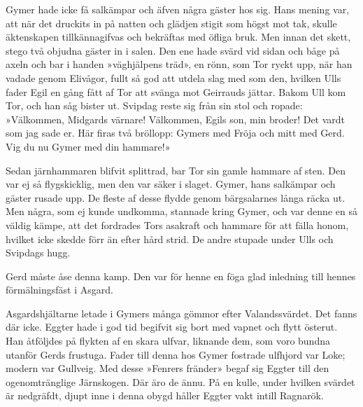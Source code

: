 \protect\hypertarget{lb1625905.xhtmlux5cux23start138}{}{}\protect\hypertarget{lb1625905.xhtmlux5cux23start138-a}{}{}\protect\hypertarget{lb1625905.xhtmlux5cux23start138-b}{}{}\protect\hypertarget{lb1625905.xhtmlux5cux23start138-c}{}{}\protect\hypertarget{lb1625905.xhtmlux5cux23start138-d}{}{}

Gymer hade icke få salkämpar och äfven några gäster hos sig. Hans mening
var, att när det druckits in på natten och glädjen stigit som högst mot
tak, skulle äktenskapen tillkännagifvas och bekräftas med öfliga bruk.
Men innan det skett, stego två objudna gäster in i salen. Den ene hade
svärd vid sidan och båge på axeln och bar i handen »väghjälpens träd»,
en rönn, som Tor ryckt upp, när han vadade genom Elivågor, fullt så god
att utdela slag med som den, hvilken Ulls fader Egil en gång fått af Tor
att svänga mot Geirrauds jättar. Bakom Ull kom Tor, och han såg bister
ut. Svipdag reste sig från sin stol och ropade: »Välkommen, Midgards
värnare! Välkommen, Egils son, min broder! Det vardt som jag sade er.
Här firas två bröllopp: Gymers med Fröja och mitt med Gerd. Vig du nu
Gymer med din hammare!»

Sedan järnhammaren blifvit splittrad, bar Tor sin gamle hammare af sten.
Den var ej så flygskicklig, men den var säker i slaget. Gymer, hans
salkämpar och gäster rusade upp. De fleste af desse flydde genom
bärgsalarnes långa räcka ut. Men några, som ej kunde undkomma, stannade
kring Gymer, och var denne en så väldig kämpe, att det fordrades Tors
asakraft och hammare för att fälla honom, hvilket icke skedde förr än
efter hård strid. De andre stupade under Ulls och Svipdags hugg.

Gerd måste åse denna kamp. Den var för henne en föga glad inledning till
hennes förmälningsfäst i Asgard.

Asgardshjältarne letade i Gymers många gömmor efter Valandssvärdet. Det
fanns där icke. Eggter hade i god tid begifvit sig bort med vapnet och
flytt österut. Han åtföljdes på flykten af en skara ulfvar, liknande
dem, som voro bundna utanför Gerds frustuga. Fader till denna hos Gymer
fostrade ulfhjord var Loke; modern var Gullveig. Med desse »Fenrers
fränder» begaf sig Eggter till den ogenomtränglige Järnskogen. Där äro
de ännu. På en kulle, under hvilken svärdet är nedgräfdt, djupt inne i
denna obygd håller Eggter vakt intill Ragnarök.

\protect\hypertarget{lb1625905.xhtmlux5cux23start139}{}{}\protect\hypertarget{lb1625905.xhtmlux5cux23start139-a}{}{}\protect\hypertarget{lb1625905.xhtmlux5cux23start139-b}{}{}\protect\hypertarget{lb1625905.xhtmlux5cux23start139-c}{}{}\protect\hypertarget{lb1625905.xhtmlux5cux23start139-d}{}{}

